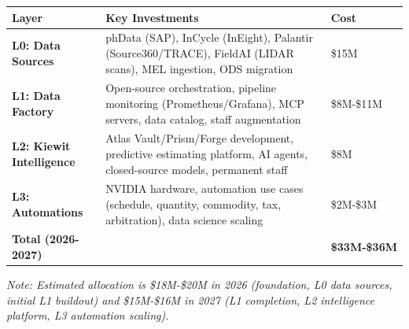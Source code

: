 \documentclass[12pt, a4paper]{article}
\begin{document}
     \vspace{1.0em}

     {\footnotesize
     }

     \vspace{0.1em}

     {\footnotesize
     \renewcommand{\arraystretch}{1.05}
     \begin{tabularx}{\textwidth}{@{}>{\raggedright\arraybackslash}p{4.5cm}>{\raggedright\arraybackslash}X>{\raggedleft\arraybackslash}p{3cm}@{}}
     \toprule
     \textbf{Layer} & \textbf{Key Investments} & \textbf{Cost} \\
     \midrule
     \textbf{L0: Data Sources} & phData (SAP), InCycle (InEight), Palantir (Source360/TRACE), FieldAI (LIDAR scans), MEL ingestion, ODS migration & \$15M \\
     \midrule
     \textbf{L1: Data Factory} & Open-source orchestration, pipeline monitoring (Prometheus/Grafana), MCP servers, data catalog, staff augmentation & \$8M-\$11M \\
     \midrule
     \textbf{L2: Kiewit Intelligence} & Atlas Vault/Prism/Forge development, predictive estimating platform, AI agents, closed-source models, permanent staff & \$8M \\
     \midrule
     \textbf{L3: Automations} & NVIDIA hardware, automation use cases (schedule, quantity, commodity, tax, arbitration), data science scaling & \$2M-\$3M \\
     \midrule
     \textbf{Total (2026-2027)} & & \textbf{\$33M-\$36M} \\
     \bottomrule
     \end{tabularx}
     \renewcommand{\arraystretch}{1.0}
     
     \vspace{0.3em}
     
     {\scriptsize \textit{Note: Estimated allocation is \$18M-\$20M in 2026 (foundation, L0 data sources, initial L1 buildout) and \$15M-\$16M in 2027 (L1 completion, L2 intelligence platform, L3 automation scaling).}}
     }

     \newpage

     {\footnotesize
     }
     \vspace{-0.9em}
\end{document}
